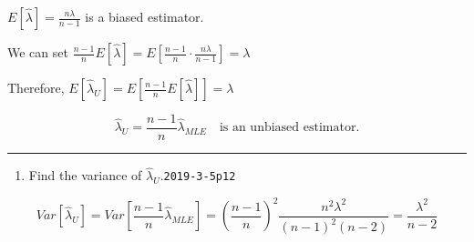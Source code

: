 \documentclass[12pt,]{article}
\providecommand{\tightlist}{%
  \setlength{\itemsep}{0pt}\setlength{\parskip}{0pt}}
\begin{document}
\(E[\hat\lambda]=\frac{n\lambda}{n-1}\) is a biased estimator.

We can set
\(\frac{n-1}{n}E[\hat\lambda]=E[\frac{n-1}{n}\cdot\frac{n\lambda}{n-1}]=\lambda\)

Therefore, \(E[\hat\lambda_{U}]=E[\frac{n-1}{n}E[\hat\lambda]]=\lambda\)

\[\hat\lambda_{U}=\frac{n-1}{n}\hat\lambda_{MLE}\quad \text{is an unbiased estimator.}\]

\begin{center}\rule{0.5\linewidth}{\linethickness}\end{center}

\begin{enumerate}
\def\labelenumi{\alph{enumi}.}
\setcounter{enumi}{4}
\tightlist
\item
  Find the variance of \(\hat\lambda_{U}\).\texttt{2019-3-5p12}
\end{enumerate}

\[Var[\hat\lambda_{U}]=Var[\frac{n-1}{n}\hat\lambda_{MLE}]=(\frac{n-1}{n})^2\frac{n^2\lambda^2}{(n-1)^2(n-2)}=\frac{\lambda^2}{n-2}\]
\end{document}
